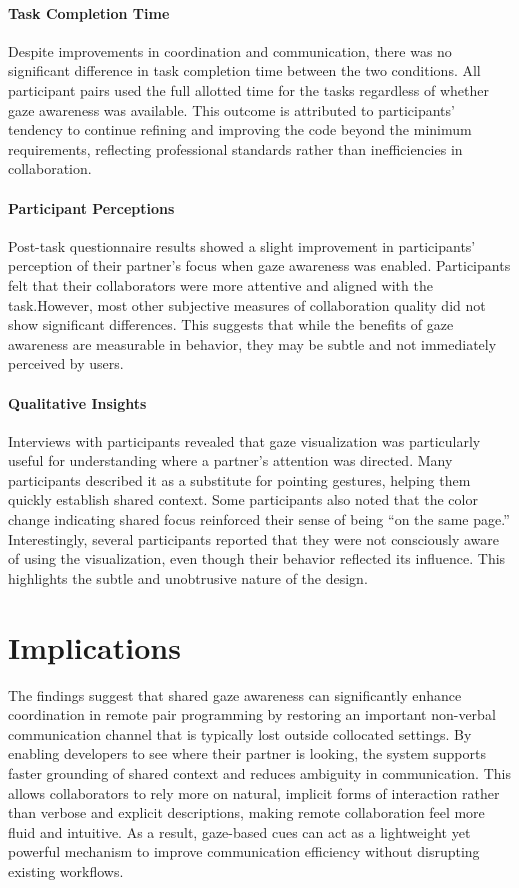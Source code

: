 \paragraph{Task Completion Time}
Despite improvements in coordination and communication, there was no significant difference in task completion time between the two conditions. All participant pairs used the full allotted time for the tasks regardless of whether gaze awareness was available. This outcome is attributed to participants’ tendency to continue refining and improving the code beyond the minimum requirements, reflecting professional standards rather than inefficiencies in collaboration.

\paragraph{Participant Perceptions}
Post-task questionnaire results showed a slight improvement in participants’ perception of their partner’s focus when gaze awareness was enabled. Participants felt that their collaborators were more attentive and aligned with the task.However, most other subjective measures of collaboration quality did not show significant differences. This suggests that while the benefits of gaze awareness are measurable in behavior, they may be subtle and not immediately perceived by users.

\paragraph{Qualitative Insights}
Interviews with participants revealed that gaze visualization was particularly useful for understanding where a partner’s attention was directed. Many participants described it as a substitute for pointing gestures, helping them quickly establish shared context. Some participants also noted that the color change indicating shared focus reinforced their sense of being “on the same page.” Interestingly, several participants reported that they were not consciously aware of using the visualization, even though their behavior reflected its influence. This highlights the subtle and unobtrusive nature of the design.


\section{Implications}
The findings suggest that shared gaze awareness can significantly enhance coordination in remote pair programming by restoring an important non-verbal communication channel that is typically lost outside collocated settings. By enabling developers to see where their partner is looking, the system supports faster grounding of shared context and reduces ambiguity in communication. This allows collaborators to rely more on natural, implicit forms of interaction rather than verbose and explicit descriptions, making remote collaboration feel more fluid and intuitive. As a result, gaze-based cues can act as a lightweight yet powerful mechanism to improve communication efficiency without disrupting existing workflows.


